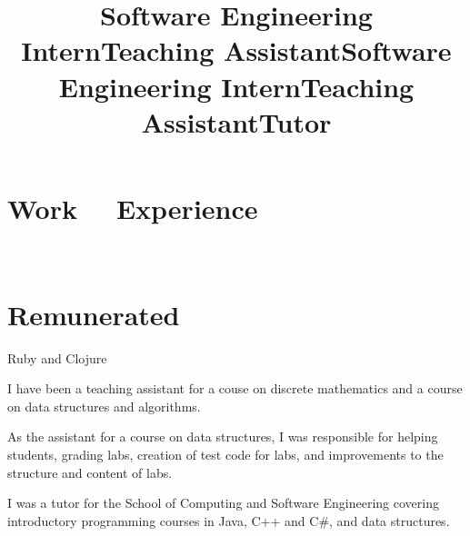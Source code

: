 \documentclass[margintitle,line]{res}
\renewcommand{\subsection}[1]{\section{\normalfont #1}}
\begin{document}
\begin{resume}


\section{Work \ \ Experience}
\ \\
\subsection{Remunerated}

\title{Software Engineering Intern}
\begin{position}
 Ruby and Clojure
\end{position}

\title{Teaching Assistant}
\begin{position}
 I have been a teaching assistant for a couse on discrete mathematics and a course on data structures and algorithms.
\end{position}

\title{Software Engineering Intern}
\begin{position}

\end{position}

\title{Teaching Assistant}
\begin{position}
 As the assistant for a course on data structures, I was responsible for helping students, grading labs, creation of test code for labs, and improvements to the structure and content of labs.
\end{position}

\title{Tutor}
\begin{position}
I was a tutor for the School of Computing and Software Engineering covering introductory programming courses in Java, C++ and C\#, and data structures.
\end{position}


\end{resume}
\end{document}
